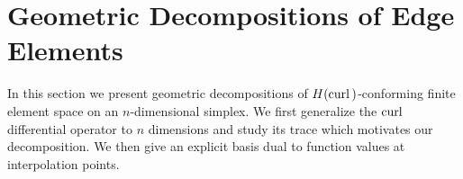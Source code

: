 \documentclass[mathpazo]{cicp}
\begin{document}
%

\section{Geometric Decompositions of Edge Elements}\label{sec:edgefem}
In this section we present geometric decompositions of $H({\rm curl\,})$-conforming finite element space on an $n$-dimensional simplex. We first generalize the ${\rm curl\,}$ differential operator to $n$ dimensions and study its trace which motivates our decomposition. We then give an explicit basis dual to function values at interpolation points.
\end{document}
